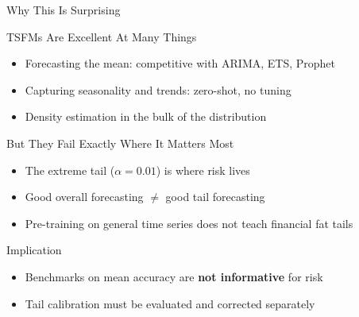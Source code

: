 \documentclass[9pt, aspectratio=169, t]{beamer}
\begin{document}
\begin{frame}{Why This Is Surprising}
	\vspace{-0.3cm}
	{\footnotesize
	\begin{block}{TSFMs Are Excellent At Many Things}
		\begin{itemize}\setlength{\itemsep}{1pt}
			\item Forecasting the mean: competitive with ARIMA, ETS, Prophet
			\item Capturing seasonality and trends: zero-shot, no tuning
			\item Density estimation in the bulk of the distribution
		\end{itemize}
	\end{block}
	\begin{alertblock}{But They Fail Exactly Where It Matters Most}
		\begin{itemize}\setlength{\itemsep}{1pt}
			\item The extreme tail ($\alpha = 0.01$) is where risk lives
			\item Good overall forecasting $\neq$ good tail forecasting
			\item Pre-training on general time series does not teach financial fat tails
		\end{itemize}
	\end{alertblock}
	\begin{block}{Implication}
		\begin{itemize}\setlength{\itemsep}{1pt}
			\item Benchmarks on mean accuracy are \textbf{not informative} for risk
			\item Tail calibration must be evaluated and corrected separately
		\end{itemize}
	\end{block}
	}
\end{frame}
\end{document}
